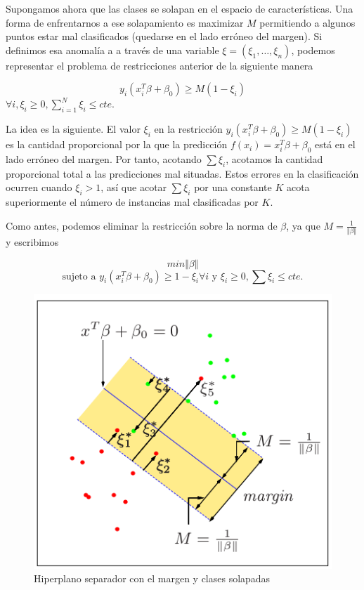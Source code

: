Supongamos ahora que las clases se solapan en el espacio de características. Una forma de enfrentarnos a ese solapamiento es maximizar $M$ permitiendo a algunos puntos estar mal clasificados (quedarse en el lado erróneo del margen). Si definimos esa anomalía a a través de una variable $\xi = (\xi_1,\dots,\xi_n)$, podemos representar el problema de restricciones anterior de la siguiente manera

$$y_i(x_i^T\beta+\beta_0) \geq M(1-\xi_i)$$
$\forall i, \xi_i \geq 0, \sum_{i=1}^{N} \xi_i \leq cte$.

La idea es la siguiente. El valor $\xi_i$ en la restricción $y_i(x_i^T\beta+\beta_0) \geq M(1-\xi_i)$ es la cantidad proporcional por la que la predicción $f(x_i) = x_i^T \beta + \beta_0$ está en el lado erróneo del margen. Por tanto, acotando $\sum \xi_i$, acotamos la cantidad proporcional total a las predicciones mal situadas. Estos errores en la clasificación ocurren cuando $\xi_i > 1$, así que acotar $\sum \xi_i$ por una constante $K$ acota superiormente el número de instancias mal clasificadas por $K$.

Como antes, podemos eliminar la restricción sobre la norma de $\beta$, ya que $M = \frac{1}{\Vert \beta \Vert}$ y escribimos

$$min \Vert \beta \Vert$$
$$\text{sujeto a } y_i(x_i^T \beta + \beta_0) \geq 1-\xi_i \forall i \text{  y  } \xi_i \geq 0, \sum \xi_i \leq cte.$$ 

\begin{figure}[H] %
	\centering
	\includegraphics[scale=0.5]{hip2.png}  %
	\caption{Hiperplano separador con el margen y clases solapadas} 
	\label{fig:hip2}
\end{figure}

